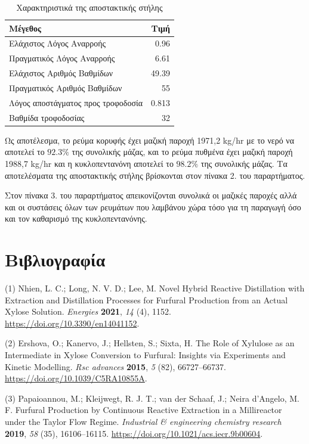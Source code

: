 \documentclass[11pt]{article}
\begin{document}
\begin{table}[htbp]
\caption{Χαρακτηριστικά της αποστακτικής στήλης}
\centering
\begin{tabular}{lr}
Μέγεθος & Τιμή\\
\hline
Ελάχιστος Λόγος Αναρροής & 0.96\\
Πραγματικός Λόγος Αναρροής & 6.61\\
Ελάχιστος Αριθμός Βαθμίδων & 49.39\\
Πραγματικός Αριθμός Βαθμίδων & 55\\
Λόγος αποστάγματος προς τροφοδοσία & 0.813\\
Βαθμίδα τροφοδοσίας & 32\\
\end{tabular}
\end{table}

Ως αποτέλεσμα, το ρεύμα κορυφής έχει μαζική παροχή 1971,2 kg/hr με το
νερό να αποτελεί το \(92.3 \%\) της συνολικής μάζας, και το ρεύμα πυθμένα έχει
μαζική παροχή 1988,7 kg/hr και η κυκλοπεντανόνη αποτελεί το \(98.2 \%\) της
συνολικής μάζας. Τα αποτελέσματα της αποστακτικής στήλης βρίσκονται στον
πίνακα 2. του παραρτήματος.

Στον πίνακα 3. του παραρτήματος απεικονίζονται συνολικά οι μαζικές
παροχές αλλά και οι συστάσεις όλων των ρευμάτων που λαμβάνου χώρα τόσο
για τη παραγωγή όσο και τον καθαρισμό της κυκλοπεντανόνης.

\section{Βιβλιογραφία}
\label{sec:orgc20deb9}
\hypertarget{citeproc_bib_item_1}{(1) Nhien, L. C.; Long, N. V. D.; Lee, M. Novel Hybrid Reactive Distillation with Extraction and Distillation Processes for Furfural Production from an Actual Xylose Solution. \textit{Energies} \textbf{2021}, \textit{14} (4), 1152. \url{https://doi.org/10.3390/en14041152}.}

\hypertarget{citeproc_bib_item_2}{(2) Ershova, O.; Kanervo, J.; Hellsten, S.; Sixta, H. The Role of Xylulose as an Intermediate in Xylose Conversion to Furfural: Insights via Experiments and Kinetic Modelling. \textit{Rsc advances} \textbf{2015}, \textit{5} (82), 66727–66737. \url{https://doi.org/10.1039/C5RA10855A}.}

\hypertarget{citeproc_bib_item_3}{(3) Papaioannou, M.; Kleijwegt, R. J. T.; van der Schaaf, J.; Neira d’Angelo, M. F. Furfural Production by Continuous Reactive Extraction in a Millireactor under the Taylor Flow Regime. \textit{Industrial \& engineering chemistry research} \textbf{2019}, \textit{58} (35), 16106–16115. \url{https://doi.org/10.1021/acs.iecr.9b00604}.}
\end{document}
